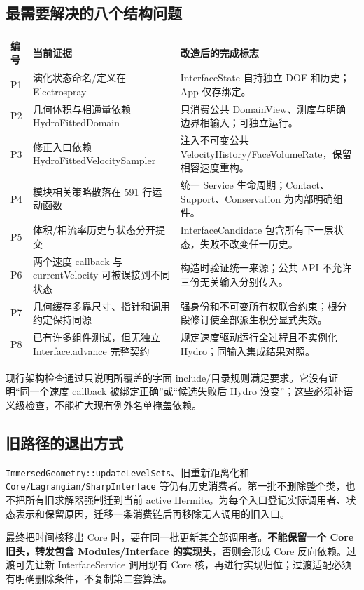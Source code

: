 \documentclass[UTF8,a4paper,11pt,fontset=fandol]{ctexart}
\newcommand{\code}[1]{\nolinkurl{#1}}
\begin{document}
\subsection{最需要解决的八个结构问题}
\begin{longtable}{@{}P{.07\textwidth}P{.35\textwidth}P{.52\textwidth}@{}}
\toprule 编号 & 当前证据 & 改造后的完成标志\\\midrule\endhead
P1 & 演化状态命名/定义在 Electrospray & InterfaceState 自持独立 DOF 和历史；App 仅存绑定。\\
P2 & 几何体积与相通量依赖 HydroFittedDomain & 只消费公共 DomainView、测度与明确边界相输入；可独立运行。\\
P3 & 修正入口依赖 HydroFittedVelocitySampler & 注入不可变公共 VelocityHistory/FaceVolumeRate，保留相容速度重构。\\
P4 & 模块相关策略散落在 591 行运动函数 & 统一 Service 生命周期；Contact、Support、Conservation 为内部明确组件。\\
P5 & 体积/相流率历史与状态分开提交 & InterfaceCandidate 包含所有下一层状态，失败不改变任一历史。\\
P6 & 两个速度 callback 与 currentVelocity 可被误接到不同状态 & 构造时验证统一来源；公共 API 不允许三份无关输入分别传入。\\
P7 & 几何缓存多靠尺寸、指针和调用约定保持同源 & 强身份和不可变所有权联合约束；根分段修订使全部派生积分显式失效。\\
P8 & 已有许多组件测试，但无独立 Interface.advance 完整契约 & 规定速度驱动运行全过程且不实例化 Hydro；同输入集成结果对照。\\
\bottomrule
\end{longtable}
现行架构检查通过只说明所覆盖的字面 include/目录规则满足要求。它没有证明“同一个速度 callback 被绑定正确”或“候选失败后 Hydro 没变”；这些必须补语义级检查，不能扩大现有例外名单掩盖依赖。

\subsection{旧路径的退出方式}
\code{ImmersedGeometry::updateLevelSets}、旧重新距离化和 \code{Core/Lagrangian/SharpInterface} 等仍有历史消费者。第一批不删除整个类，也不把所有旧求解器强制迁到当前 active Hermite。为每个入口登记实际调用者、状态表示和保留原因，迁移一条消费链后再移除无人调用的旧入口。

最终把时间核移出 Core 时，要在同一批更新其全部调用者。\textbf{不能保留一个 Core 旧头，转发包含 Modules/Interface 的实现头}，否则会形成 Core 反向依赖。过渡可先让新 InterfaceService 调用现有 Core 核，再进行实现归位；过渡适配必须有明确删除条件，不复制第二套算法。
\end{document}
